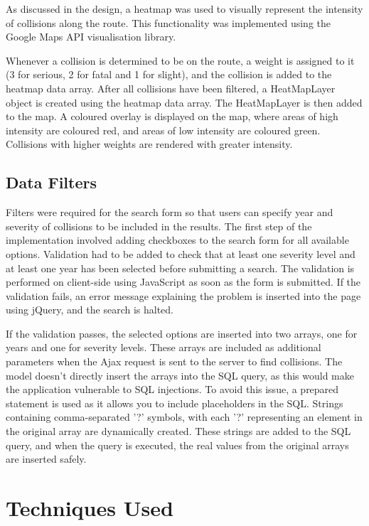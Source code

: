 \documentclass[authoryearcitations]{UoYCSproject}
\begin{document}
As discussed in the design, a heatmap was used to visually represent the intensity of collisions along the route. This functionality was implemented using the Google Maps API visualisation library.

Whenever a collision is determined to be on the route, a weight is assigned to it (3 for serious, 2 for fatal and 1 for slight), and the collision is added to the heatmap data array. After all collisions have been filtered, a HeatMapLayer object is created using the heatmap data array. The HeatMapLayer is then added to the map. A coloured overlay is displayed on the map, where areas of high intensity are coloured red, and areas of low intensity are coloured green. Collisions with higher weights are rendered with greater intensity.

\subsection{Data Filters}

Filters were required for the search form so that users can specify year and severity of collisions to be included in the results. The first step of the implementation involved adding checkboxes to the search form for all available options. Validation had to be added to check that at least one severity level and at least one year has been selected before submitting a search. The validation is performed on client-side using JavaScript as soon as the form is submitted. If the validation fails, an error message explaining the problem is inserted into the page using jQuery, and the search is halted. 

If the validation passes, the selected options are inserted into two arrays, one for years and one for severity levels. These arrays are included as additional parameters when the Ajax request is sent to the server to find collisions. The model doesn't directly insert the arrays into the SQL query, as this would make the application vulnerable to SQL injections. To avoid this issue, a prepared statement is used as it allows you to include placeholders in the SQL. Strings containing comma-separated '?' symbols, with each '?' representing an element in the original array are dynamically created. These strings are added to the SQL query, and when the query is executed, the real values from the original arrays are inserted safely.

\section{Techniques Used}
\end{document}
